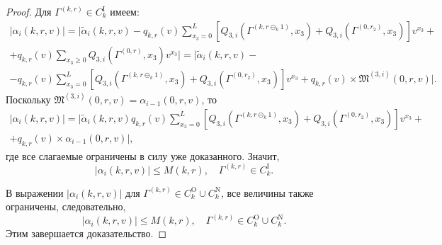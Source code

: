 \documentclass{report}
\begin{document}
\begin{proof}
Для $\Gamma^{(k, r)} \in C_{k}^{\mathrm{I}}$ имеем:
\begin{multline*}
|\alpha_i(k,r,v) |=|\tilde{\alpha}_i(k,r,v) - q_{k,r}(v)\sum_{x_3=0}^{L} \left[ Q_{3,i}(\Gamma^{(k,r\ominus_k 1)},x_3) + Q_{3,i}(\Gamma^{(0,r_2)},x_3) \right] v^{x_3}+\\  +q_{{k},{r}}(v)  \sum_{x_3\geqslant 0} Q_{3,i}(\Gamma^{(0,{r})},x_3) v^{x_3}| = |\tilde{\alpha}_i(k,r,v)  -\\- q_{k,r}(v) \sum_{x_3=0}^{L} \left[ Q_{3,i}(\Gamma^{(k,r\ominus_k 1)},x_3) + Q_{3,i}(\Gamma^{(0,r_2)},x_3) \right] v^{x_3} + q_{{k},{r}}(v)\times \mathfrak{M}^{(3,i)}(0,r,v) |.
\end{multline*}
Поскольку $\mathfrak{M}^{(3,i)}(0,r,v) = \alpha_{i-1}(0,r,v)$, то 
\begin{multline*}
|\alpha_i(k,r,v) |= |\tilde{\alpha}_i(k,r,v)   q_{k,r}(v) \sum_{x_3=0}^{L} \left[ Q_{3,i}(\Gamma^{(k,r\ominus_k 1)},x_3) + Q_{3,i}(\Gamma^{(0,r_2)},x_3) \right] v^{x_3} + \\+q_{{k},{r}}(v)\times \alpha_{i-1}(0,r,v)|,
\end{multline*}
где все слагаемые ограничены в силу уже доказанного. Значит,
\begin{equation*}
|\alpha_i(k,r,v) |\leqslant M(k,r), \quad \Gamma^{(k, r)} \in C_{k}^{\mathrm{I}}.
\end{equation*}

В выражении $|\alpha_i(k,r,v)| $ для $\Gamma^{(k, r)} \in C_{k}^{\mathrm{O}} \cup C_{k}^{\mathrm{N}}$, все величины также ограничены, следовательно,
\begin{equation*}
|\alpha_i(k,r,v) |\leqslant M(k,r), \quad \Gamma^{(k, r)} \in C_{k}^{\mathrm{O}} \cup C_{k}^{\mathrm{N}}.
\end{equation*}
Этим завершается доказательство.

\end{proof}
\end{document}
